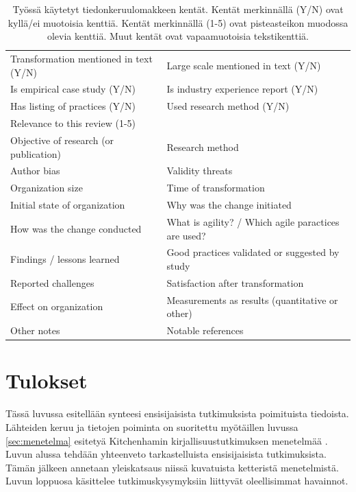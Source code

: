 \begin{table}
    \begin{tabular}{| l | p{7.64cm} |}
        \hline
        Transformation mentioned in text (Y/N) &
        Large scale mentioned in text (Y/N) \\
        Is empirical case study (Y/N) &
        Is industry experience report (Y/N) \\
        Has listing of practices (Y/N) &
        Used research method (Y/N) \\
        Relevance to this review (1-5) & \\
        Objective of research (or publication) &
        Research method \\
        Author bias &
        Validity threats \\
        Organization size &
        Time of transformation \\
        Initial state of organization &
        Why was the change initiated \\
        How was the change conducted &
        What is agility? / Which agile paractices are used? \\
        Findings / lessons learned &
        Good practices validated or suggested by study \\
        Reported challenges &
        Satisfaction after transformation \\
        Effect on organization &
        Measurements as results (quantitative or other) \\
        Other notes &
        Notable references \\
        \hline
    \end{tabular}
    \caption{Työssä käytetyt tiedonkeruulomakkeen kentät. Kentät merkinnällä
    (Y/N) ovat kyllä/ei muotoisia kenttiä. Kentät merkinnällä (1-5) ovat
    pisteasteikon muodossa olevia kenttiä. Muut kentät ovat vapaamuotoisia
    tekstikenttiä.}
    \label{table:dataform}
\end{table}


\clearpage
\section{Tulokset}
\label{sec:tulokset}

Tässä luvussa esitellään synteesi ensisijaisista tutkimuksista poimituista
tiedoista. Lähteiden keruu ja tietojen poiminta on suoritettu myötäillen luvussa
\ref{sec:menetelma} esitetyä Kitchenhamin kirjallisuustutkimuksen menetelmää
. Luvun alussa tehdään yhteenveto tarkastelluista
ensisijaisista tutkimuksista. Tämän jälkeen annetaan yleiskatsaus niissä
kuvatuista ketteristä menetelmistä. Luvun loppuosa käsittelee
tutkimuskysymyksiin liittyvät oleellisimmat havainnot.

